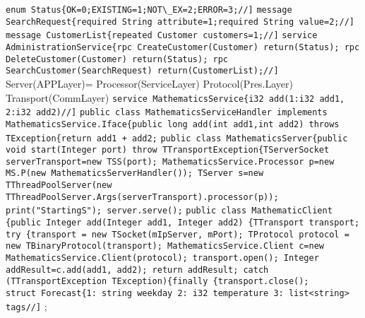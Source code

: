 \lstinline{enum Status{OK=0;EXISTING=1;NOT\_EX=2;ERROR=3;//]}
\lstinline{message SearchRequest{required String attribute=1;required String value=2;//]} 
\lstinline{message CustomerList{repeated Customer customers=1;//]}
\lstinline{service AdministrationService{rpc CreateCustomer(Customer) return(Status); rpc DeleteCustomer(Customer) return(Status); rpc SearchCustomer(SearchRequest) return(CustomerList);//]}
Server(APPLayer)=
Processor(ServiceLayer)
\bluetext{+}
Protocol(Pres.Layer)
\bluetext{+}
Transport(CommLayer)
\lstinline{service MathematicsService{i32 add(1:i32 add1, 2:i32 add2)//]}
\lstinline{public class MathematicsServiceHandler implements MathematicsService.Iface{public long add(int add1,int add2) throws TException{return add1 + add2;}
\lstinline{public class MathematicsServer{public void start(Integer port) throw TTransportException{TServerSocket serverTransport=new TSS(port); MathematicsService.Processor p=new MS.P(new MathematicsServerHandler()); TServer s=new TThreadPoolServer(new TThreadPoolServer.Args(serverTransport).processor(p)); print("StartingS"); server.serve();}
\lstinline{public class MathematicClient {public Integer add(Integer add1, Integer add2) {TTransport transport; try {transport = new TSocket(mIpServer, mPort); TProtocol protocol = new TBinaryProtocol(transport); MathematicsService.Client c=new MathematicsService.Client(protocol); transport.open(); Integer addResult=c.add(add1, add2); return addResult; catch (TTransportException TException){finally {transport.close();}
%
%
%
\\
\btext{\hlgray{++:}}
\btext{\hlgray{--:}}
\lstinline{struct Forecast{1: string weekday 2: i32 temperature 3: list<string> tags//]}
;
